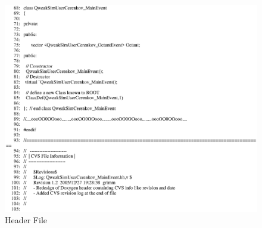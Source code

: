 \begin{figure}[ht]
  \hspace{0cm}
  \includegraphics[scale=0.8]{./figures5/QweakSimUserCerenkov_MainEvent.hh-p2.eps}
  \caption{\label{SourceV25} Header File}
           \label{fig:V-SC-29}
\end{figure}

\clearpage

